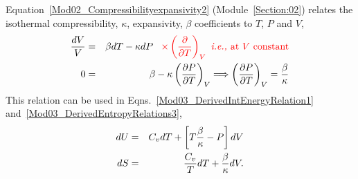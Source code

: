 Equation~\ref{Mod02_Compressibilityexpansivity2} (Module~\ref{Section:02}) relates the isothermal compressibility, $\kappa$, expansivity, $\beta$ coefficients to $T$, $P$ and $V$,
     \begin{eqnarray}
        \frc{dV}{V} &=& \beta dT - \kappa dP \;\;\;\red{\times\Partial[]{T}{V} \nonumber \text{ \ie at }V\text{ constant}} \nonumber \\
            0       &=& \beta - \kappa\Partial[P]{T}{V} \Longrightarrow \Partial[P]{T}{V} = \frc{\beta}{\kappa} \nonumber
     \end{eqnarray}
This relation can be used in Eqns.~\ref{Mod03_DerivedIntEnergyRelation1} and~\ref{Mod03_DerivedEntropyRelations3},
     \begin{eqnarray}
        dU &=& C_{v}dT + \left[T\frc{\beta}{\kappa}-P\right]dV\label{Mod03_DerivedIntEnergyRelation2} \\
        dS &=& \frc{C_{v}}{T}dT + \frc{\beta}{\kappa}dV.\label{Mod03_DerivedEntropyRelations4}
     \end{eqnarray}

